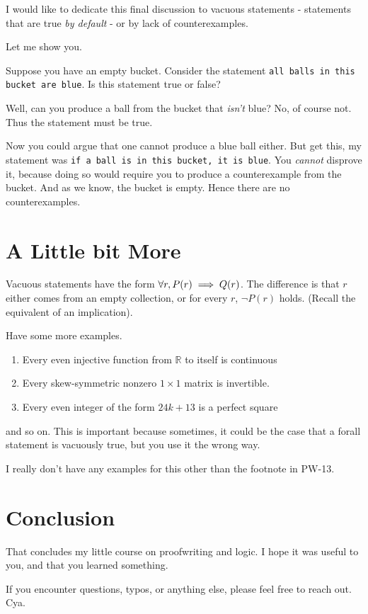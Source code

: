 

I would like to dedicate this final discussion to vacuous statements - statements that are true \textit{by default} - or by lack of counterexamples.

Let me show you.

Suppose you have an empty bucket. Consider the statement \texttt{all balls in this bucket are blue}. Is this statement true or false?

Well, can you produce a ball from the bucket that \textit{isn't} blue? No, of course not. Thus the statement must be true.

Now you could argue that one cannot produce a blue ball either. But get this, my statement was \texttt{if a ball is in this bucket, it is blue}. You \textit{cannot} disprove it, because doing so would require you to produce a counterexample from the bucket. And as we know, the bucket is empty. Hence there are no counterexamples.

\section*{A Little bit More}
Vacuous statements have the form $\forall \space r, P(r) \implies Q(r)$. The difference is that $r$ either comes from an empty collection, or for every $r$, $\neg P(r)$ holds. (Recall the equivalent of an implication).

Have some more examples.
\begin{enumerate}
    \item Every even injective function from $\mathbb R$ to itself is continuous
    \item Every skew-symmetric nonzero $1\times 1$ matrix is invertible.
    \item Every even integer of the form $24k+13$ is a perfect square
\end{enumerate}
and so on. This is important because sometimes, it could be the case that a forall statement is vacuously true, but you use it the wrong way.

I really don't have any examples for this other than the footnote in PW-13.

\section*{Conclusion}
That concludes my little course on proofwriting and logic. I hope it was useful to you, and that you learned something. 

If you encounter questions, typos, or anything else, please feel free to reach out. Cya.
